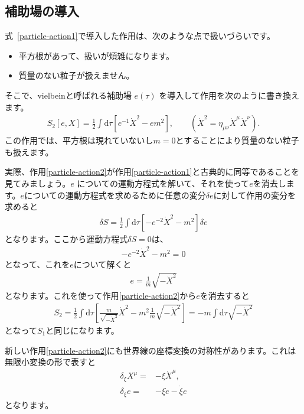 \documentclass[report,paper=a4, fontsize=12pt, line_length=16cm, number_of_lines=33,dvipdfmx]{jlreq}
\numberwithin{equation}{chapter}
\numberwithin{equation}{section}
\newcommand{\di}{\mathrm{d}}
\begin{document}
\subsection{補助場の導入}
式~\eqref{particle-action1}で導入した作用は、次のような点で扱いづらいです。
\begin{itemize}
 \item 平方根があって、扱いが煩雑になります。
 \item 質量のない粒子が扱えません。
\end{itemize}
そこで、vielbeinと呼ばれる補助場 $e(\tau)$ を導入して作用を次のように書き換えます。
\begin{align}
 S_{2}[e,X]=\frac12 \int \di \tau\left[
e^{-1}\dot{X}^2-em^2
\right],\qquad (\dot{X}^2=\eta_{\mu\nu}\dot{X}^{\mu}\dot{X}^{\nu}).
\label{particle-action2}
\end{align}
この作用では、平方根は現れていないし$m=0$とすることにより質量のない粒子も扱えます。

実際、作用\eqref{particle-action2}が作用\eqref{particle-action1}と古典的に同等であることを見てみましょう。$e$ についての運動方程式を解いて、それを使って$e$を消去します。$e$についての運動方程式を求めるために任意の変分$\delta e$に対して作用の変分を求めると
\begin{align}
 \delta S=\frac12 \int \di \tau\left[
-e^{-2}\dot{X}^2-m^2
\right]\delta e
\end{align}
となります。ここから運動方程式$\delta S=0$は、
\begin{align}
 -e^{-2}\dot{X}^2-m^2=0
\end{align}
となって、これを$e$について解くと
\begin{align}
 e=\frac{1}{m}\sqrt{-\dot{X}^2}
\end{align}
となります。これを使って作用\eqref{particle-action2}から$e$を消去すると
\begin{align}
 S_2=\frac12\int \di \tau\left[
\frac{m}{\sqrt{-\dot{X}^2}}\dot{X}^2
-m^2\frac{1}{m}\sqrt{-\dot{X}^2}
\right]=-m\int \di \tau\sqrt{-\dot{X}^2}
\end{align}
となって$S_1$と同じになります。

新しい作用\eqref{particle-action2}にも世界線の座標変換の対称性があります。これは無限小変換の形で表すと
\begin{equation}
\begin{aligned}
 \delta_{\xi}X^{\mu}=&-\xi \dot{X}^{\mu},\\
\delta_{\xi}e=&-\xi \dot{e}-\dot{\xi} e
\end{aligned} \label{reparam2}
\end{equation}
となります。
\end{document}
